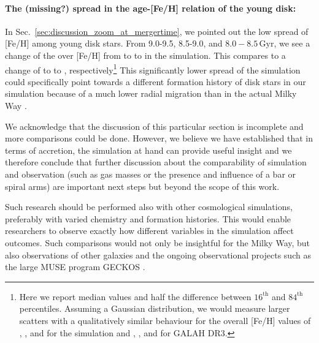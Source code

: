 \documentclass[fleqn,usenatbib]{mnras}
\begin{document}
\paragraph*{The (missing?) spread in the age-[Fe/H] relation of the young disk:}

In Sec.~\ref{sec:discussion_zoom_at_mergertime}, we pointed out the low spread of [Fe/H] among young disk stars. From 9.0-9.5, 8.5-9.0, and $8.0-8.5\,\mathrm{Gyr}$, we see a change of the over [Fe/H] from  to  to  in the simulation. This compares to a change of  to  to , respectively\footnote{Here we report median values and half the difference between $16^\mathrm{th}$ and $84^\mathrm{th}$ percentiles. Assuming a Gaussian distribution, we would measure larger scatters with a qualitatively similar behaviour for the overall [Fe/H] values of ,  , and   for the simulation and ,  , and  for GALAH DR3.} This significantly lower spread of the simulation could specifically point towards a different formation history of disk stars in our simulation because of a much lower radial migration than in the actual Milky Way  \citep{Minchev2010, Loebman2011, Frankel2018}.

We acknowledge that the discussion of this particular section is incomplete and more comparisons could be done. However, we believe we have established that in terms of accretion, the simulation at hand can provide useful insight and we therefore conclude that further discussion about the comparability of simulation and observation (such as gas masses or the presence and influence of a bar or spiral arms) are important next steps but beyond the scope of this work.

Such research should be performed also with other cosmological simulations, preferably with varied chemistry and formation histories. This would enable researchers to observe exactly how different variables in the simulation affect outcomes. Such comparisons would not only be insightful for the Milky Way, but also observations of other galaxies \citep[compare for example figures by][to our Fig.~\ref{fig:accretion_rate}]{Pinna2019, Pinna2019b, Martig2021} and the ongoing observational projects such as the large MUSE program GECKOS \citep{GECKOS2023}.
\end{document}
